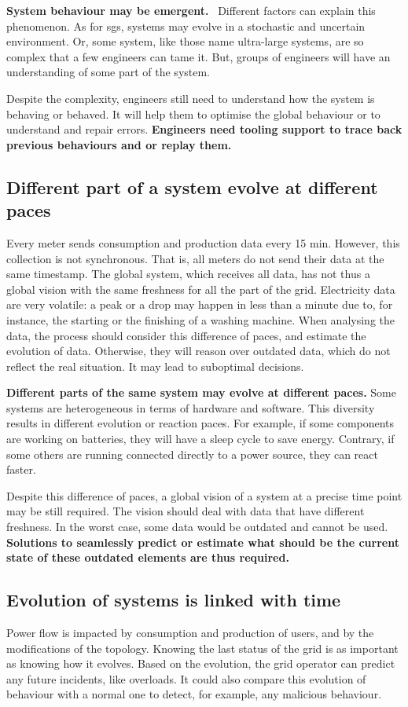 \textbf{System behaviour may be emergent.}~\cite{zio2011uncertainties}
Different factors can explain this phenomenon.
As for \glspl{sg}, systems may evolve in a stochastic and uncertain environment.
Or, some system, like those name ultra-large systems, are so complex that a few engineers can tame it.
But, groups of engineers will have an understanding of some part of the system.

Despite the complexity, engineers still need to understand how the system is behaving or behaved.
It will help them to optimise the global behaviour or to understand and repair errors.
\textbf{Engineers need tooling support to trace back previous behaviours and or replay them.}


\subsection{Different part of a system evolve at different paces}
Every meter sends consumption and production data every 15 min.
However, this collection is not synchronous.
That is, all meters do not send their data at the same timestamp.
The global system, which receives all data, has not thus a global vision with the same freshness for all the part of the grid.
Electricity data are very volatile: a peak or a drop may happen in less than a minute due to, for instance, the starting or the finishing of a washing machine.
When analysing the data, the process should consider this difference of paces, and estimate the evolution of data.
Otherwise, they will reason over outdated data, which do not reflect the real situation.
It may lead to suboptimal decisions.

\textbf{Different parts of the same system may evolve at different paces.}
Some systems are heterogeneous in terms of hardware and software.
This diversity results in different evolution or reaction paces.
For example, if some components are working on batteries, they will have a sleep cycle to save energy.
Contrary, if some others are running connected directly to a power source, they can react faster.

Despite this difference of paces, a global vision of a system at a precise time point may be still required.
The vision should deal with data that have different freshness.
In the worst case, some data would be outdated and cannot be used.
\textbf{Solutions to seamlessly predict or estimate what should be the current state of these outdated elements are thus required.}


\subsection{Evolution of systems is linked with time}
Power flow is impacted by consumption and production of users, and by the modifications of the topology.
Knowing the last status of the grid is as important as knowing how it evolves.
Based on the evolution, the grid operator can predict any future incidents, like overloads.
It could also compare this evolution of behaviour with a normal one to detect, for example, any malicious behaviour.

